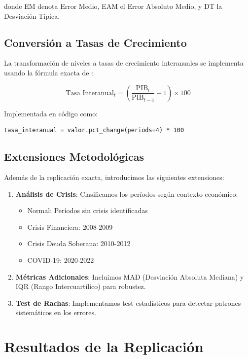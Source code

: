 \documentclass[12pt,a4paper]{article}
\begin{document}
donde EM denota Error Medio, EAM el Error Absoluto Medio, y DT la Desviación Típica.

\subsection{Conversión a Tasas de Crecimiento}

La transformación de niveles a tasas de crecimiento interanuales se implementa usando la fórmula exacta de \citet{pavia2017}:

\begin{equation}
\text{Tasa Interanual}_t = \left(\frac{\text{PIB}_t}{\text{PIB}_{t-4}} - 1\right) \times 100
\end{equation}

Implementada en código como:
\begin{verbatim}
tasa_interanual = valor.pct_change(periods=4) * 100
\end{verbatim}

\subsection{Extensiones Metodológicas}

Además de la replicación exacta, introducimos las siguientes extensiones:

\begin{enumerate}
\item \textbf{Análisis de Crisis}: Clasificamos los períodos según contexto económico:
   \begin{itemize}
   \item Normal: Períodos sin crisis identificadas
   \item Crisis Financiera: 2008-2009
   \item Crisis Deuda Soberana: 2010-2012  
   \item COVID-19: 2020-2022
   \end{itemize}

\item \textbf{Métricas Adicionales}: Incluimos MAD (Desviación Absoluta Mediana) y IQR (Rango Intercuartílico) para robustez.

\item \textbf{Test de Rachas}: Implementamos test estadísticos para detectar patrones sistemáticos en los errores.
\end{enumerate}

\section{Resultados de la Replicación}
\end{document}
